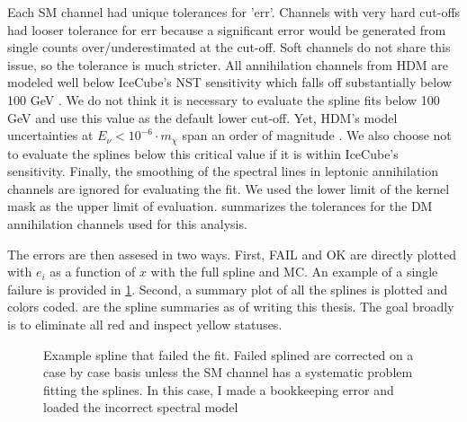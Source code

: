 Each SM channel had unique tolerances for 'err'.
Channels with very hard cut-offs had looser tolerance for err because a significant error would be generated from single counts over/underestimated at the cut-off.
Soft channels do not share this issue, so the tolerance is much stricter.
All annihilation channels from HDM are modeled well below IceCube's NST sensitivity which falls off substantially below 100 GeV \cite{IC3_thesis_Cerver}.
We do not think it is necessary to evaluate the spline fits below 100 GeV and use this value as the default lower cut-off.
Yet, HDM's model uncertainties at $E_\nu < 10^{-6}\cdot m_\chi$ span an order of magnitude \cite{HDMSpectra}.
We also choose not to evaluate the splines below this critical value if it is within IceCube's sensitivity.
Finally, the smoothing of the spectral lines in leptonic annihilation channels are ignored for evaluating the fit.
We used the lower limit of the kernel mask as the upper limit of evaluation.
 summarizes the tolerances for the DM annihilation channels used for this analysis.


The errors are then assesed in two ways.
First, FAIL and OK are directly plotted with $e_i$ as a function of $x$ with the full spline and MC.
An example of a single failure is provided in \cref{fig:icDM_failedspline}.
Second, a summary plot of all the splines is plotted and colors coded.
 are the spline summaries as of writing this thesis.
The goal broadly is to eliminate all red and inspect yellow statuses.

\begin{figure}
    \caption{Example spline that failed the fit. Failed splined are corrected on a case by case basis unless the SM channel has a systematic problem fitting the splines. In this case, I made a bookkeeping error and loaded the incorrect spectral model}
    \label{fig:icDM_failedspline}
\end{figure}

